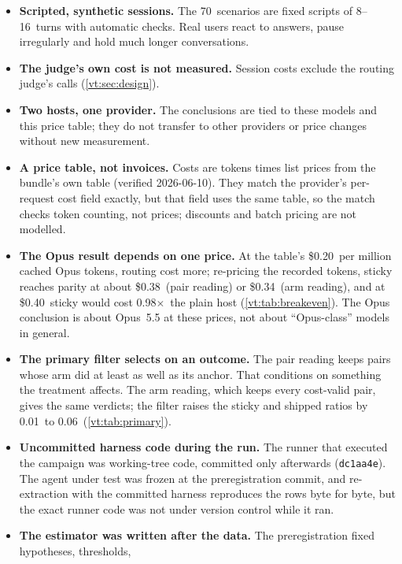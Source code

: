 \documentclass[11pt,letterpaper]{article}
\newcommand{\code}[1]{\texttt{#1}}
\newcommand{\X}{\ensuremath{\times}}
\newcommand{\BEStickyArm}{0.34}
\newcommand{\BEStickyForty}{0.98}
\newcommand{\BEStickyPair}{0.38}
\newcommand{\FilterLiftHigh}{0.06}
\newcommand{\FilterLiftLow}{0.01}
\newcommand{\HarnessSha}{dc1aa4e}
\newcommand{\MaxTurns}{16}
\newcommand{\MinTurns}{8}
\newcommand{\NScenarios}{70}
\newcommand{\PriceOpusRead}{0.20}
\newcommand{\RateForty}{0.40}
\newcommand{\RatesVerified}{2026-06-10}
\begin{document}
\begin{itemize}
  \item \textbf{Scripted, synthetic sessions.} The \NScenarios\ scenarios are fixed scripts of
    \MinTurns--\MaxTurns\ turns with automatic checks. Real users react to answers, pause irregularly and
    hold much longer conversations.
  \item \textbf{The judge's own cost is not measured.} Session costs exclude the routing judge's calls
    (\cref{vt:sec:design}).
  \item \textbf{Two hosts, one provider.} The conclusions are tied to these models and this price table;
    they do not transfer to other providers or price changes without new measurement.
  \item \textbf{A price table, not invoices.} Costs are tokens times list prices from the bundle's own table
    (verified \RatesVerified). They match the provider's per-request cost field exactly, but that field uses
    the same table, so the match checks token counting, not prices; discounts and batch pricing are not
    modelled.
  \item \textbf{The Opus result depends on one price.} At the table's \$\PriceOpusRead\ per million cached
    Opus tokens, routing cost more; re-pricing the recorded tokens, sticky reaches parity at about
    \$\BEStickyPair\ (pair reading) or \$\BEStickyArm\ (arm reading), and at \$\RateForty\ sticky would cost
    \BEStickyForty\X\ the plain host (\cref{vt:tab:breakeven}). The Opus conclusion is about Opus~5.5 at these
    prices, not about ``Opus-class'' models in general.
  \item \textbf{The primary filter selects on an outcome.} The pair reading keeps pairs whose arm did at
    least as well as its anchor. That conditions on something the treatment affects. The arm reading, which
    keeps every cost-valid pair, gives the same verdicts; the filter raises the sticky and shipped ratios by
    \FilterLiftLow\ to \FilterLiftHigh\ (\cref{vt:tab:primary}).
  \item \textbf{Uncommitted harness code during the run.} The runner that executed the campaign was
    working-tree code, committed only afterwards (\code{\HarnessSha}). The agent under test was frozen at the
    preregistration commit, and re-extraction with the committed harness reproduces the rows byte for byte,
    but the exact runner code was not under version control while it ran.
  \item \textbf{The estimator was written after the data.} The preregistration fixed hypotheses, thresholds,

\end{itemize}
\end{document}

